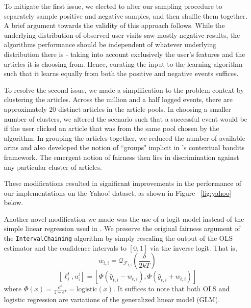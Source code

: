 \documentclass[11pt]{article}
\begin{document}
To mitigate the first issue, we elected to alter our sampling procedure to separately sample positive and negative samples, and then shuffle them together. A brief argument towards the validity of this approach follows. While the underlying distribution of observed user visits saw mostly negative results, the algorithms performance should be independent of whatever underlying distribution there is - taking into account exclusively the user's features and the articles it is choosing from. Hence, curating the input to the learning algorithm such that it learns equally from both the positive and negative events suffices.

To resolve the second issue, we made a simplification to the problem context by clustering the articles. Across the million and a half logged events, there are approximately $20$ distinct articles in the article pools. In choosing a smaller number of clusters, we altered the scenario such that a successful event would be if the user clicked an article that was from the same pool chosen by the algorithm. In grouping the articles together, we reduced the number of available arms and also developed the notion of ``groups" implicit in 's contextual bandits framework. The emergent notion of fairness then lies in discrimination against any particular cluster of articles.

These modifications resulted in significant improvements in the performance of our implementations on the Yahoo! dataset, as shown in Figure ~\ref{fig:yahoo} below.

Another novel modification we made was the use of a logit model instead of the simple linear regression used in . We preserve the original fairness argument of the \texttt{IntervalChaining} algorithm by simply rescaling the output of the OLS estimator and the confidence intervals to $[0, 1]$ via the inverse logit. That is,
$$w_{t,i} = \mathcal{Q}_{\mathcal{F}_{t,i}}(\frac{\delta}{2kT})$$
$$[\ell_{i}^{t}, u_{i}^{t}] = [\Phi(\hat{y}_{t,i} - w_{t,i}), \Phi(\hat{y}_{t,i} + w_{t,i})]$$
where $\Phi(x) = \frac{e^{x}}{1 + e^{x}} = \text{logistic}(x)$. It suffices to note that both OLS and logistic regression are variations of the generalized linear model (GLM).
\end{document}
